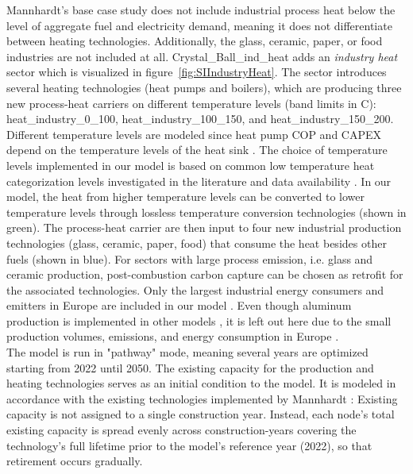 Mannhardt's base case study does not include industrial process heat below the level of aggregate fuel and electricity demand, meaning it does not differentiate between heating technologies. Additionally, the glass, ceramic, paper, or food industries are not included at all. Crystal\_Ball\_ind\_heat adds an \emph{industry heat} sector which is visualized in figure~\ref{fig:SIIndustryHeat}. The sector introduces several heating technologies (heat pumps and boilers), which are producing three new process-heat carriers on different temperature levels (band limits in \degree C): heat\_industry\_0\_100, heat\_industry\_100\_150, and heat\_industry\_150\_200. Different temperature levels are modeled since heat pump COP and CAPEX depend on the temperature levels of the heat sink \cite{DEA2026, Bever2024, Agora_IGE2023}. The choice of temperature levels implemented in our model is based on common low temperature heat categorization levels investigated in the literature and data availability \cite{Rehfeldt2017, Wolf2017}. In our model, the heat from higher temperature levels can be converted to lower temperature levels through lossless temperature conversion technologies (shown in green). The process-heat carrier are then input to four new industrial production technologies (glass, ceramic, paper, food) that consume the heat besides other fuels (shown in blue). For sectors with large process emission, i.e. glass and ceramic production, post-combustion carbon capture can be chosen as retrofit for the associated technologies. Only the largest industrial energy consumers and emitters in Europe are included in our model \cite{Eurostat2022, JRC2023}. Even though aluminum production is implemented in other models \cite{Mayer2024, PyPSAEurSec30}, it is left out here due to the small production volumes, emissions, and energy consumption in Europe \cite{wyns2019metals}. \\

The model is run in "pathway" mode, meaning several years are optimized starting from 2022 until 2050. The existing capacity for the production and heating technologies serves as an initial condition to the model. It is modeled in accordance with the existing technologies implemented by Mannhardt \cite{Mannhardt2026}: Existing capacity is not assigned to a single construction year. Instead, each node's total existing capacity is spread evenly across construction-years covering the technology's full lifetime prior to the model's reference year (2022), so that retirement occurs gradually. 

